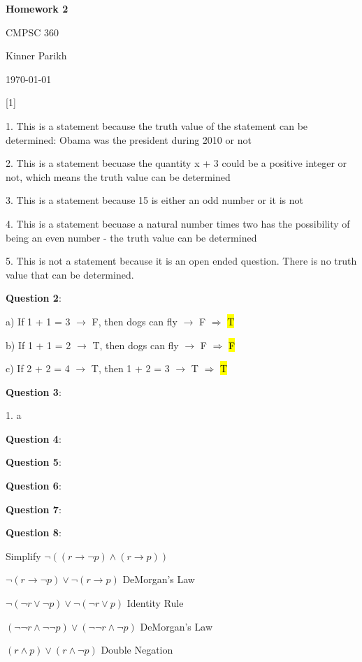 \documentclass{article} %
\newcommand{\question}[2][]{\begin{flushleft}
        \textbf{Question #1}: \textit{#2}

\end{flushleft}}
\newcommand{\maketitletwo}[2][]{\begin{center}
        \Large{\textbf{Homework #1}
            
            CMPSC 360} %
        \vspace{5pt}
        
        \normalsize{Kinner Parikh  %
        
        \today}        %
        \vspace{15pt}
        
\end{center}}
\begin{document}
    \maketitletwo[2]  %
    
    \question[1]{}
    
    1. This is a statement because the truth value of the statement can be determined: Obama was \tabto{1cm} the president during 2010 or not

    2. This is a statement becuase the quantity x + 3 could be a positive integer or not, which \tabto{1cm} means the truth value can be determined

    3. This is a statement because 15 is either an odd number or it is not

    4. This is a statement becuase a natural number times two has the possibility of being an even \tabto{1cm} number - the truth value can be determined

    5. This is not a statement because it is an open ended question. There is no truth value that \tabto{1cm} can be determined.

    \question[2]{}

    a) If 1 + 1 = 3 $\rightarrow$ F, then dogs can fly $\rightarrow$ F $\Rightarrow$  \hl{T}

    b) If 1 + 1 = 2 $\rightarrow$ T, then dogs can fly $\rightarrow$ F $\Rightarrow$  \hl{F}

    c) If 2 + 2 = 4 $\rightarrow$ T, then 1 + 2 = 3 $\rightarrow$ T $\Rightarrow$  \hl{T}

    \question[3]{}

    1. a 
    
    \question[4]{}

    \question[5]{}

    \question[6]{}

    \question[7]{}

    \question[8]{}

    Simplify $\neg ((r \rightarrow \neg p) \land (r \rightarrow p))$

    \hspace*{0.05cm}

    $\neg(r \rightarrow \neg p) \lor \neg(r \rightarrow p) $ \tabto*{5cm} DeMorgan's Law

    $\neg(\neg r \lor \neg p) \lor \neg( \neg r \lor p) $ \tabto*{5cm} Identity Rule

    $(\neg \neg r \land \neg \neg p) \lor (\neg \neg r \land \neg p) $ \tabto*{5cm} DeMorgan's Law

    $(r \land p) \lor (r \land \neg p)$ \tabto*{5cm} Double Negation \hspace*{2cm}
\end{document}
